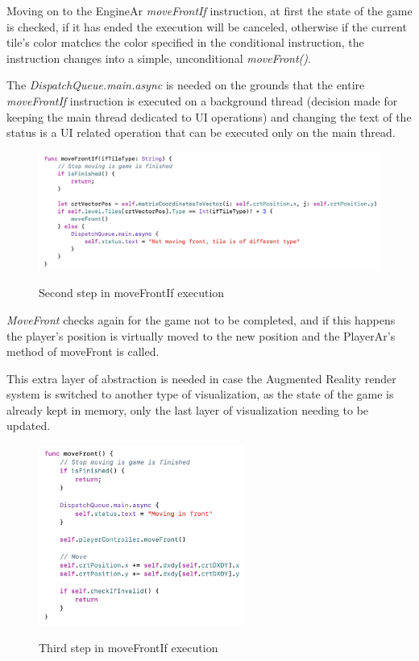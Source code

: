 \documentclass[12 pct]{report}
\begin{document}
Moving on to the EngineAr \textit{moveFrontIf} instruction, at first the state of the game is checked, if it has ended the execution will be canceled, otherwise if the current tile's color matches the color specified in the conditional instruction, the instruction changes into a simple, unconditional \textit{moveFront()}.

The \textit{DispatchQueue.main.async} is needed on the grounds that the entire \textit{moveFrontIf} instruction is executed on a background thread (decision made for keeping the main thread dedicated to UI operations) and changing the text of the status is a UI related operation that can be executed only on the main thread.

\begin{figure}[H]
\includegraphics[width=1.0\textwidth]{move-front-if-2}
\centering
\label{fig:feature-points}
\caption{ Second step in moveFrontIf execution }
\end{figure}

\textit{MoveFront} checks again for the game not to be completed, and if this happens the player's position is virtually moved to the new position and the PlayerAr's method of moveFront is called. 

This extra layer of abstraction is needed in case the Augmented Reality render system is switched to another type of visualization, as the state of the game is already kept in memory, only the last layer of visualization needing to be updated.
\begin{figure}[H]
\includegraphics[width=0.6\textwidth]{move-front-if-3}
\centering
\label{fig:feature-points}
\caption{ Third step in moveFrontIf execution }
\end{figure}
\end{document}
